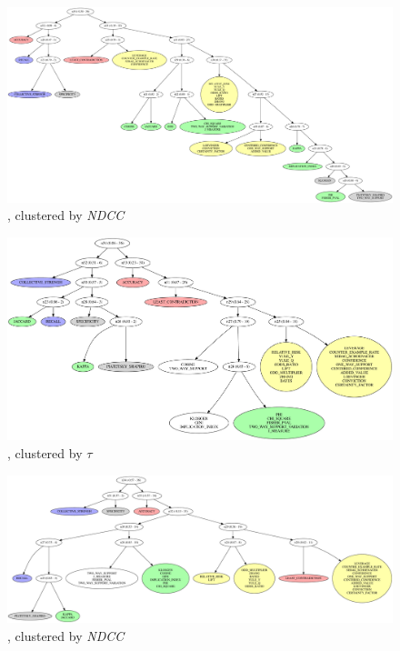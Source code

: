 \begin{figure}[th!]
  \begin{center}
  \includegraphics[angle=90,origin=c,height=0.6\textheight]{svg/rankingcom/patterns_demo-global-NDCG.pdf}
  \caption{\demoassoc, clustered by {\em NDCC}}
  \end{center}
\end{figure}

\begin{figure}[th!]
  \begin{center}
  \includegraphics[angle=90,origin=c,height=0.6\textheight]{svg/rankingcom/patterns_prods_per_ticket-global-KENDAL.pdf}
  \caption{\prodassocreceipt, clustered by $\tau$}
  \end{center}
\end{figure}

\begin{figure}[th!]
  \begin{center}
  \includegraphics[angle=90,origin=c,height=0.6\textheight]{svg/rankingcom/patterns_prods_per_ticket-global-NDCG.pdf}
  \caption{\prodassocreceipt, clustered by {\em NDCC}}
  \end{center}
\end{figure}

